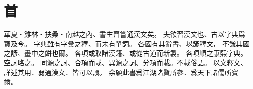 \chapter*{首}
華夏・雞林・扶桑・南越之內、書生齊嘗通漢文矣。
夫欲習漢文也、古以字典爲寶及今。
字典雖有字彙之釋、而未有單詞。
各國有其辭書、以諺釋文，
不識其國之諺、畫中之餅也爾。
各項或取諸漢籍、或從古道而新製。
各項順之康熙字典。空詞略之。
同源之詞、合項而載、異源之詞、分項而載。不載俗語。
以文釋文、詳述其用、弱通漢文、皆可以讀。
余願此書爲江湖諸賢所參、爲天下諸儒所寶爾。
